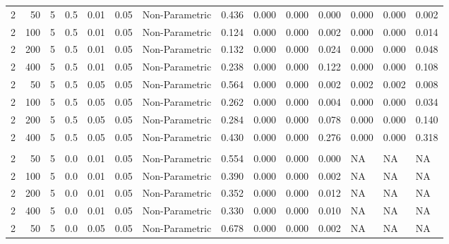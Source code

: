 \begin{table}
{{\begin{tabular}{rrrrrrllllllll}
\hspace{1em}2 & 50 & 5 & 0.5 & 0.01 & 0.05 & Non-Parametric & 0.436 & 0.000 & 0.000 & 0.000 & 0.000 & 0.000 & 0.002\\
\hspace{1em}2 & 100 & 5 & 0.5 & 0.01 & 0.05 & Non-Parametric & 0.124 & 0.000 & 0.000 & 0.002 & 0.000 & 0.000 & 0.014\\
\hspace{1em}2 & 200 & 5 & 0.5 & 0.01 & 0.05 & Non-Parametric & 0.132 & 0.000 & 0.000 & 0.024 & 0.000 & 0.000 & 0.048\\
\hspace{1em}2 & 400 & 5 & 0.5 & 0.01 & 0.05 & Non-Parametric & 0.238 & 0.000 & 0.000 & 0.122 & 0.000 & 0.000 & 0.108\\
\hspace{1em}2 & 50 & 5 & 0.5 & 0.05 & 0.05 & Non-Parametric & 0.564 & 0.000 & 0.000 & 0.002 & 0.002 & 0.002 & 0.008\\
\hspace{1em}2 & 100 & 5 & 0.5 & 0.05 & 0.05 & Non-Parametric & 0.262 & 0.000 & 0.000 & 0.004 & 0.000 & 0.000 & 0.034\\
\hspace{1em}2 & 200 & 5 & 0.5 & 0.05 & 0.05 & Non-Parametric & 0.284 & 0.000 & 0.000 & 0.078 & 0.000 & 0.000 & 0.140\\
\hspace{1em}2 & 400 & 5 & 0.5 & 0.05 & 0.05 & Non-Parametric & 0.430 & 0.000 & 0.000 & 0.276 & 0.000 & 0.000 & 0.318\\
\addlinespace[0.3em]
\multicolumn{14}{l}{\textbf{$t_3$ Distribution}}\\
\hspace{1em}2 & 50 & 5 & 0.0 & 0.01 & 0.05 & Non-Parametric & 0.554 & 0.000 & 0.000 & 0.000 & NA & NA & NA\\
\hspace{1em}2 & 100 & 5 & 0.0 & 0.01 & 0.05 & Non-Parametric & 0.390 & 0.000 & 0.000 & 0.002 & NA & NA & NA\\
\hspace{1em}2 & 200 & 5 & 0.0 & 0.01 & 0.05 & Non-Parametric & 0.352 & 0.000 & 0.000 & 0.012 & NA & NA & NA\\
\hspace{1em}2 & 400 & 5 & 0.0 & 0.01 & 0.05 & Non-Parametric & 0.330 & 0.000 & 0.000 & 0.010 & NA & NA & NA\\
\hspace{1em}2 & 50 & 5 & 0.0 & 0.05 & 0.05 & Non-Parametric & 0.678 & 0.000 & 0.000 & 0.002 & NA & NA & NA\\

\end{tabular}}}
\end{table}

